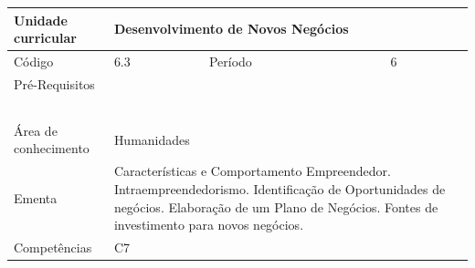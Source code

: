 \clearpage
\newpage

\begin{quadro}[ht!]
  \centering\scriptsize
\caption{Unidade Curricular Desenvolvimento de Novos Negócios}

\begin{tabular}{|p{2.5cm}|p{2.5cm}|p{2.5cm}|p{2.5cm}|p{2.5cm}|}\hline

  Unidade curricular & \multicolumn{4}{p{10cm}|}{ Desenvolvimento de Novos Negócios }\\\hline
  Código & 6.3 & Período & \multicolumn{2}{p{5cm}|}{ 6 }\\\hline
  Pré-Requisitos & \multicolumn{4}{p{10cm}|}{  } \\\hline
  \cellcolor{blue1}{ CH PRESENCIAL } &
    \cellcolor{blue1}{CH EAD Síncrona} &
    \cellcolor{blue1}{CH EAD Síncrona Mediada} &
    \cellcolor{blue1}{CH EAD Assíncrona} &
    \cellcolor{blue1}{CH APCC} \\\hline
  \cellcolor{blue1}{ 0 } &
    \cellcolor{blue1}{ 0 } &
    \cellcolor{blue1}{ 30 } &
    \cellcolor{blue1}{ 0 } &
    \cellcolor{blue1}{0} \\\hline
  \cellcolor{blue1}{ CH Teórica } &
    \cellcolor{blue1}{CH Prática} &
    \cellcolor{blue1}{CH Humanidades} &
    \cellcolor{blue1}{CH Extensão} &
    \cellcolor{blue1}{CH EAD TOTAL} \\\hline
  \cellcolor{blue1}{ 15 } &
    \cellcolor{blue1}{ 15 } &
    \cellcolor{blue1}{ 30 } &
    \cellcolor{blue1}{ 0 } &
    \cellcolor{blue1}{ 30 } \\\hline
  \cellcolor{blue1}{CARGA-HORÁRIA TOTAL} & \multicolumn{4}{p{10cm}|}{ \cellcolor{blue1}{ 30 } } \\\hline
  Área de conhecimento & \multicolumn{4}{p{10cm}|}{ Humanidades } \\\hline
  Ementa & \multicolumn{4}{p{10cm}|}{ Características e Comportamento Empreendedor. Intraempreendedorismo. Identificação de Oportunidades de negócios. Elaboração de um Plano de Negócios. Fontes de investimento para novos negócios.  } \\\hline
  Competências & \multicolumn{4}{p{10cm}|}{ C7 } \\\hline


  
	\end{tabular}

\end{quadro}


\clearpage
\newpage

